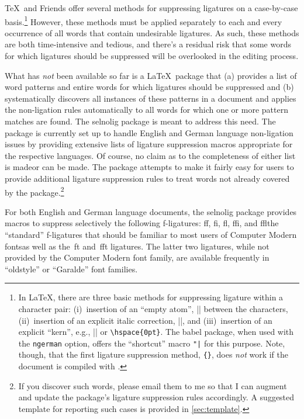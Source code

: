 \documentclass[12pt]{article}
\newcommand{\pkg}[1]{\textsf{#1}}
\newcommand{\opt}[1]{\texttt{#1}}
\begin{document}
\TeX\ and Friends offer several methods for suppressing ligatures on a case-by-case basis.\footnote{In \LaTeX, there are three basic methods for suppressing ligature within a character pair: (i)~insertion of an \enquote{empty atom}, |{}| between the characters, (ii)~insertion of an explicit italic correction, |\/|, and (iii)~insertion of an explicit \enquote{kern}, e.g., |\kern0pt| or \Verb/\hspace{0pt}/. The \pkg{babel} package, when used with the \opt{ngerman} option, offers the \enquote{shortcut} macro \Verb/"|/ for this purpose. Note, though, that the first ligature suppression method, \Verb/{}/, does \emph{not} work if the document is compiled with \LuaLaTeX.} However, these methods must be applied separately to each and every occurrence of all words that contain undesirable ligatures. As such, these methods are both time-intensive and tedious, and there's a residual risk that some words for which ligatures should be suppressed will be overlooked in the editing process. 

What has \emph{not} been available so far is a \LaTeX\ package that (a) provides a list of word patterns and entire words for which ligatures should be suppressed and (b) systematically discovers all instances of these patterns in a document and applies the non-ligation rules automatically to all words for which one or more pattern matches are found. The \pkg{selnolig} package is meant to address this need. The package is currently set up to handle English and German language non-ligation issues by providing extensive lists of ligature suppression macros appropriate for the respective languages. Of course, no claim as to the completeness of either list is made\textemdash or can be made. The package attempts to make it fairly easy for users to provide additional ligature suppression rules to treat words not already covered by the package.\footnote{If you discover such words, please email them to me so that I can augment and update the package's ligature suppression rules accordingly. A suggested template for reporting such cases is provided in \cref{sec:template}.} 

For both English and German language documents, the \pkg{selnolig} package provides macros to suppress selectively the following f-ligatures: ff, fi, fl, ffi, and ffl\textemdash the \enquote{standard} f-ligatures that should be familiar to most users of Computer Modern fonts\textemdash as well as the~ft and~fft ligatures. The latter two ligatures, while not provided by the Computer Modern font family, are available frequently in \enquote{oldstyle} or \enquote{Garalde} font families.
\end{document}
